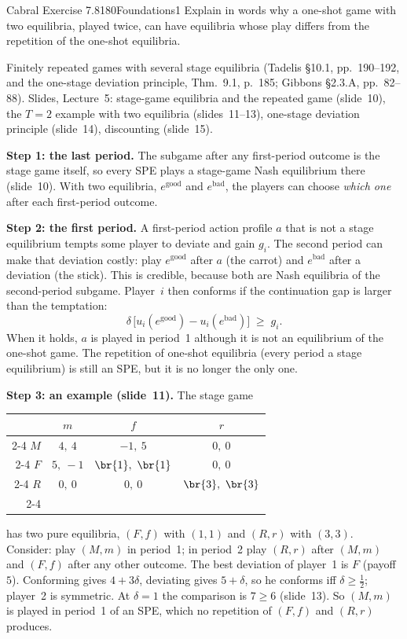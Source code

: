 \begin{exsol}{Cabral Exercise 7.8}{180}{Foundations}{1}
\asked Explain in words why a one-shot game with two equilibria, played twice, can have equilibria
whose play differs from the repetition of the one-shot equilibria.

\method Finitely repeated games with several stage equilibria (Tadelis \S10.1, pp.~190--192, and the
one-stage deviation principle, Thm.~9.1, p.~185; Gibbons \S2.3.A, pp.~82--88). Slides, Lecture~5:
stage-game equilibria and the repeated game (slide~10), the $T=2$ example with two equilibria
(slides~11--13), one-stage deviation principle (slide~14), discounting (slide~15).

\solution
\textbf{Step 1: the last period.} The subgame after any first-period outcome is the stage game
itself, so every SPE plays a stage-game Nash equilibrium there (slide~10). With two equilibria,
$e^{\text{good}}$ and $e^{\text{bad}}$, the players can choose \emph{which one} after each
first-period outcome.

\textbf{Step 2: the first period.} A first-period action profile $a$ that is not a stage equilibrium
tempts some player to deviate and gain $g_i$. The second period can make that deviation costly:
play $e^{\text{good}}$ after $a$ (the carrot) and $e^{\text{bad}}$ after a deviation (the stick). This
is credible, because both are Nash equilibria of the second-period subgame. Player~$i$ then
conforms if the continuation gap is larger than the temptation:
\[
  \delta\,\bigl[u_i(e^{\text{good}}) - u_i(e^{\text{bad}})\bigr] \;\ge\; g_i .
\]
When it holds, $a$ is played in period~1 although it is not an equilibrium of the one-shot game. The
repetition of one-shot equilibria (every period a stage equilibrium) is still an SPE, but it is no
longer the only one.

\textbf{Step 3: an example (slide~11).} The stage game
\begin{center}
\begin{tabular}{r|c|c|c|}
\multicolumn{1}{r}{} & \multicolumn{1}{c}{$m$} & \multicolumn{1}{c}{$f$} & \multicolumn{1}{c}{$r$}\\ \cline{2-4}
$M$ & $4,\ 4$ & $-1,\ 5$ & $0,\ 0$ \\ \cline{2-4}
$F$ & $5,\ -1$ & $\br{1},\ \br{1}$ & $0,\ 0$ \\ \cline{2-4}
$R$ & $0,\ 0$ & $0,\ 0$ & $\br{3},\ \br{3}$ \\ \cline{2-4}
\end{tabular}
\end{center}
has two pure equilibria, $(F,f)$ with $(1,1)$ and $(R,r)$ with $(3,3)$. Consider: play $(M,m)$ in
period~1; in period~2 play $(R,r)$ after $(M,m)$ and $(F,f)$ after any other outcome. The best
deviation of player~1 is $F$ (payoff $5$). Conforming gives $4 + 3\delta$, deviating gives
$5 + \delta$, so he conforms iff $\delta \ge \frac12$; player~2 is symmetric. At $\delta=1$ the
comparison is $7 \ge 6$ (slide~13). So $(M,m)$ is played in period~1 of an SPE, which no repetition
of $(F,f)$ and $(R,r)$ produces.


\end{exsol}
